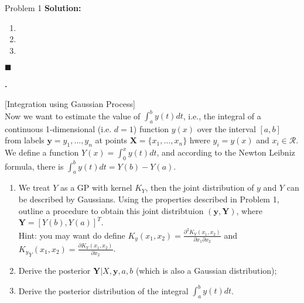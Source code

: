 \documentclass{article}
\newcounter{pcounter}                                   %
\newenvironment{problem}                                %
{                                                       %
    \color{gray}                                        %
    \stepcounter{pcounter}                              %
    \textbf{\arabic{pcounter}.}                         %
}{}                                                     %
\newenvironment{solution}                               %
{\textbf{Solution:} }{$\blacksquare$}                   %
\newcommand{\domR}{\mathcal{R}}                         %
\begin{document}
\begin{section}{Problem 1}
        \begin{solution}
            \begin{enumerate}[label=\alph*)]
                \item %
                
                \item %
                
                \item %
                
            \end{enumerate}
        \end{solution}

        \begin{problem}
            [Integration using Gaussian Process] \\
            Now we want to estimate the value of $\int_{a}^{b} y(t) dt$, i.e., the integral of a continuous 1-dimensional (i.e. $d=1$) function $y(x)$ over the interval $[a,b]$ from labels $\mathbf{y} = y_1, \dots, y_n$ at points $\mathbf{X} = \{x_1, \dots, x_n\}$ hwere $y_i = y(x)$ and $x_i \in \domR$. \\
            We define a function $Y(x) = \int_{0}^{x} y(t) dt$, and according to the Newton Leibniz formula, there is $\int_{a}^{b} y(t) dt = Y(b) - Y(a)$.
            \begin{enumerate}[label=\alph*)]
                \item We treat $Y$ as a GP with kernel $K_Y$, then the joint distribution of $y$ and $Y$ can be described by Gaussians. Using the properties described in Problem 1, outline a procedure to obtain this joint distribtuion $(\mathbf{y}, \mathbf{Y})$, where $\mathbf{Y} = [Y(b), Y(a)]^T$.\\
                Hint: you may want do define $K_y(x_1, x_2) = \frac{\partial^2 K_Y(x_1, x_2)}{\partial x_1 \partial x_2}$ and ${K_y}_{Y}(x_1, x_2) = \frac{\partial K_Y(x_1, x_2)}{\partial x_2}$.

                \item Derive the posterior $\mathbf{Y}|X, \mathbf{y}, a, b$ (which is also a Gaussian distribution);
                
                \item Derive the posterior distribution of the integral $\int_{a}^{b} y(t) dt$.
            \end{enumerate}
        \end{problem}


\end{section}
\end{document}
